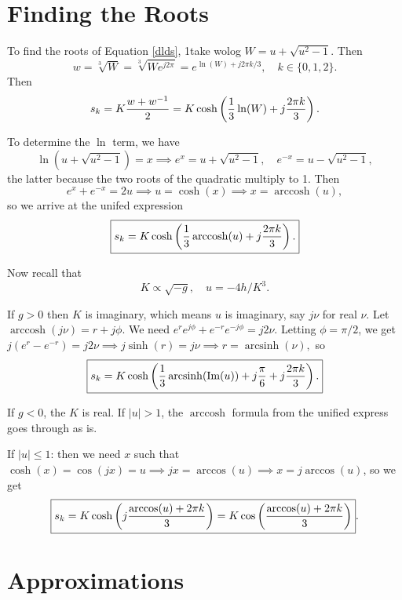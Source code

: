 \documentclass[10pt]{article}
\newcommand{\im}{\text{Im}}
\DeclareMathOperator*{\arcsinh}{arcsinh}
\DeclareMathOperator*{\arccosh}{arccosh}
\begin{document}
\section*{Finding the Roots}
To find the roots of Equation \ref{dlds}, 1take wolog $W = u + \sqrt{u^2 - 1}$.
Then $$w = \sqrt[3]{W} = \sqrt[3]{W e^{j 2\pi}}= e^{\ln(W) + j2\pi k/3},\quad k \in \{0,1,2\}.$$
Then $$s_k = K {w + w^{-1} \over 2} = K \cosh\left({1 \over 3} \ln(W)+ j { 2\pi k \over 3}\right).$$

To determine the $\ln$ term, we have $$ \ln(u + \sqrt{u^2 - 1}) = x \implies e^x = u + \sqrt{u^2 - 1}, \quad e^{-x} = u - \sqrt{u^2 - 1},$$ the latter because the two roots of the quadratic multiply to 1. Then $$e^x + e^{-x} = 2 u \implies u = \cosh(x) \implies x = \arccosh(u),$$ so we arrive at the unifed expression $$ \boxed{s_k = K \cosh\left({1 \over 3} \arccosh(u) + j {2\pi k \over 3}\right).}$$

Now recall that $$ K \propto \sqrt{-g}, \quad u = - {4 h /K^3}.$$

If $g > 0$ then $K$ is imaginary, which means $u$ is imaginary, say $j \nu$ for real $\nu$. Let $ \arccosh(j\nu) = r + j \phi.$ We need $e^r e^{j\phi} + e^{-r} e^{-j\phi} = j 2 \nu.$ Letting $\phi = \pi/2$, we get $j (e^r -  e^{-r}) = j 2 \nu \implies j \sinh(r) = j \nu \implies r = \arcsinh(\nu),$ so $$ \boxed{s_k = K \cosh\left({1 \over 3} \arcsinh(\im(u)) + j{\pi \over 6} + j{2\pi k \over 3}\right).}$$

If $g < 0$, the $K$ is real. If $|u|> 1$, the $\arccosh$ formula from the unified express goes through as is.

If $|u| \le 1$: then we need $x$ such that $\cosh(x) = \cos(jx) = u \implies jx = \arccos(u) \implies x = j \arccos(u)$, so we get $$ \boxed{s_k = K \cosh\left(j {\arccos(u) + 2\pi k \over 3} \right) = K \cos\left({\arccos(u) + 2\pi k \over 3} \right) }.$$ 
\pagebreak
\section*{Approximations}
\end{document}
